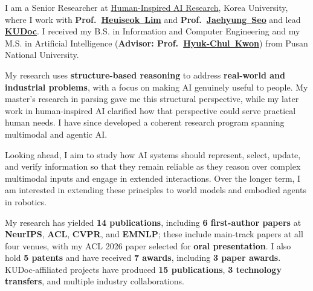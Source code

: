 \documentclass[11pt, a4paper]{awesome-cv}
\newcommand*{\cvlink}[2]{\href{#1}{\textcolor{linkcolor}{#2}}}
\begin{document}
\makecvheader[C]


\begin{cvparagraph}
{\RaggedRight I am a Senior Researcher at \cvlink{https://hiai.korea.ac.kr/}{Human-Inspired AI Research}, Korea University, where I work with \textbf{Prof.~\cvlink{https://scholar.google.com/citations?user=HMTkz7oAAAAJ}{Heuiseok~Lim}} and \textbf{Prof.~\cvlink{https://scholar.google.com/citations?user=V8bFAUIAAAAJ}{Jaehyung~Seo}} and lead \cvlink{https://kudocai.github.io/index.html}{\textbf{KUDoc}}. I received my B.S. in Information and Computer Engineering and my M.S. in Artificial Intelligence (\textbf{Advisor: Prof.~\cvlink{https://www.researchgate.net/profile/Hyuk-Chul-Kwon}{Hyuk-Chul~Kwon}}) from Pusan National University.\par}

\smallskip
My research uses \textbf{structure-based reasoning} to address \textbf{real-world and industrial problems}, with a focus on making AI genuinely useful to people. My master's research in parsing gave me this structural perspective, while my later work in human-inspired AI clarified how that perspective could serve practical human needs. I have since developed a coherent research program spanning multimodal and agentic AI.

\smallskip
Looking ahead, I aim to study how AI systems should represent, select, update, and verify information so that they remain reliable as they reason over complex multimodal inputs and engage in extended interactions. Over the longer term, I am interested in extending these principles to world models and embodied agents in robotics.

\smallskip
My research has yielded \textbf{14 publications}, including \textbf{6 first-author papers} at \textbf{NeurIPS}, \textbf{ACL}, \textbf{CVPR}, and \textbf{EMNLP}; these include main-track papers at all four venues, with my ACL 2026 paper selected for \textbf{oral presentation}. I also hold \textbf{5 patents} and have received \textbf{7 awards}, including \textbf{3 paper awards}. KUDoc-affiliated projects have produced \textbf{15 publications}, \textbf{3 technology transfers}, and multiple industry collaborations.
\end{cvparagraph}
\end{document}
